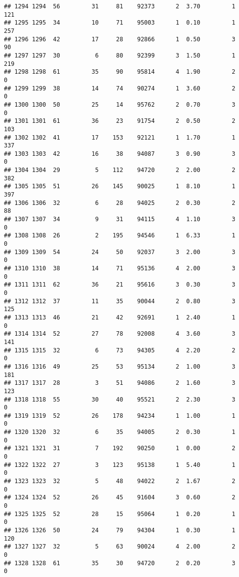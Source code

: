 \documentclass[
]{article}
\begin{document}
\begin{verbatim}
## 1294 1294  56         31     81    92373      2  3.70         1      121
## 1295 1295  34         10     71    95003      1  0.10         1      257
## 1296 1296  42         17     28    92866      1  0.50         3       90
## 1297 1297  30          6     80    92399      3  1.50         1      219
## 1298 1298  61         35     90    95814      4  1.90         2        0
## 1299 1299  38         14     74    90274      1  3.60         2        0
## 1300 1300  50         25     14    95762      2  0.70         3        0
## 1301 1301  61         36     23    91754      2  0.50         2      103
## 1302 1302  41         17    153    92121      1  1.70         1      337
## 1303 1303  42         16     38    94087      3  0.90         3        0
## 1304 1304  29          5    112    94720      2  2.00         2      382
## 1305 1305  51         26    145    90025      1  8.10         1      397
## 1306 1306  32          6     28    94025      2  0.30         2       88
## 1307 1307  34          9     31    94115      4  1.10         3        0
## 1308 1308  26          2    195    94546      1  6.33         1        0
## 1309 1309  54         24     50    92037      3  2.00         3        0
## 1310 1310  38         14     71    95136      4  2.00         3        0
## 1311 1311  62         36     21    95616      3  0.30         3        0
## 1312 1312  37         11     35    90044      2  0.80         3      125
## 1313 1313  46         21     42    92691      1  2.40         1        0
## 1314 1314  52         27     78    92008      4  3.60         3      141
## 1315 1315  32          6     73    94305      4  2.20         2        0
## 1316 1316  49         25     53    95134      2  1.00         3      181
## 1317 1317  28          3     51    94086      2  1.60         3      123
## 1318 1318  55         30     40    95521      2  2.30         3        0
## 1319 1319  52         26    178    94234      1  1.00         1        0
## 1320 1320  32          6     35    94005      2  0.30         1        0
## 1321 1321  31          7    192    90250      1  0.00         2        0
## 1322 1322  27          3    123    95138      1  5.40         1        0
## 1323 1323  32          5     48    94022      2  1.67         2        0
## 1324 1324  52         26     45    91604      3  0.60         2        0
## 1325 1325  52         28     15    95064      1  0.20         1        0
## 1326 1326  50         24     79    94304      1  0.30         1      120
## 1327 1327  32          5     63    90024      4  2.00         2        0
## 1328 1328  61         35     30    94720      2  0.20         3        0

\end{verbatim}
\end{document}
